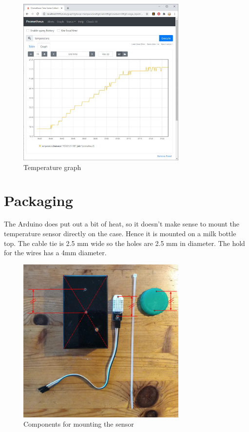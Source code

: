\documentclass[a4paper, 11pt]{article}
\begin{document}
\begin{figure}[H]
  \centering
  \includegraphics[width=0.75\textwidth]{graph.jpg}
  \caption{Temperature graph}
\end{figure}
  
\section{Packaging}

The Arduino does put out a bit of heat,
so it doesn't make sense to mount the temperature
sensor directly on the case.
Hence it is mounted on a milk bottle top.
The cable tie is 2.5 mm wide so the holes are 2.5 mm in diameter.
The hold for the wires has a 4mm diameter.

\begin{figure}[H]
  \centering
  \includegraphics[width=0.75\textwidth]{sensor-mount.jpg}
  \caption{Components for mounting the sensor}
\end{figure}
\end{document}
